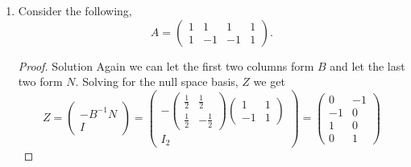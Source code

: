 \documentclass[12pt]{article}
\makeatletter
\theoremstyle{homework}
\newenvironment{exercise}[1]
{\def\@currentlabel{#1}\exercisecore}
{\endexercisecore}
\makeatother
\begin{document}
\begin{exercise}{3.1}
\begin{enumerate}
    \item[(iii)] Consider the following,
    \begin{equation*}
      A = \begin{pmatrix}
        1 & 1 & 1 & 1\\
        1 &-1& -1& 1
      \end{pmatrix}.
    \end{equation*}
    \begin{proof}{Solution}
    Again we can let the first two columns form $B$ and let the last two form $N$. Solving for the null space basis, $Z$ we get
    \begin{equation*}
      Z =  
      \begin{pmatrix}
        -B^{-1}N\\
         I
      \end{pmatrix} = 
      \begin{pmatrix}
        - \begin{pmatrix}\frac{1}{2}&\frac{1}{2}\\ \frac{1}{2}&-\frac{1}{2}\end{pmatrix} \begin{pmatrix}1&1\\ -1&1\end{pmatrix}\\
        I_2
      \end{pmatrix} = 
      \begin{pmatrix}
        0&-1\\ 
        -1&0\\
        1 & 0 \\
        0 & 1
      \end{pmatrix}
    \end{equation*}
    \end{proof}
\end{enumerate}
\end{exercise}
\vspace{.5in}
\end{document}
